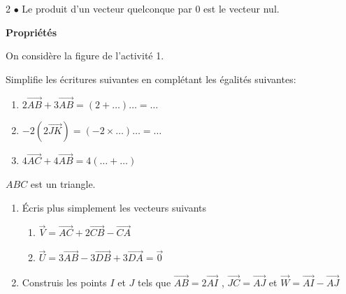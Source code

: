 \begin{multicols*}{2}
{  		$\bullet$ Le produit d’un vecteur quelconque par $0$ est le vecteur nul.}
  	
  	 \textbf{Propriétés }
  	
  	On considère la figure de l'activité 1.
  	
  	Simplifie les écritures suivantes en complétant les égalités suivantes:
  	\begin{enumerate}
  		\item $2\overrightarrow{AB}+ 3\overrightarrow{AB}=(2+\dots)\dots=\dots$	
  		\item $-2\left(2\overrightarrow{JK}\right)=(-2 \times \dots)\dots=\dots$
  		\item $4\overrightarrow{AC}+ 4\overrightarrow{AB}=4\left(\dots+\dots\right)$
  	\end{enumerate}
  	\dures
  	 
  	
  	
  	$ABC$ est un triangle.
  	\begin{enumerate}
  		\item Écris plus simplement les vecteurs suivants  
  		\begin{enumerate}
  			\item $\overrightarrow{V}=\overrightarrow{AC}+2\overrightarrow{CB}-\overrightarrow{CA}$
  			\item $\overrightarrow{U}=3\overrightarrow{AB}-3\overrightarrow{DB}+3\overrightarrow{DA}=\overrightarrow{0}$
  		\end{enumerate}
  		\item  Construis les points $I$ et $J$ tels que $\overrightarrow{AB}=2\overrightarrow{AI}$ , $\overrightarrow{JC}=\overrightarrow{AJ}$
  		et $\overrightarrow{W}=\overrightarrow{AI}-\overrightarrow{AJ}$
  	\end{enumerate}
  	\dures
  	 

\end{multicols*}
